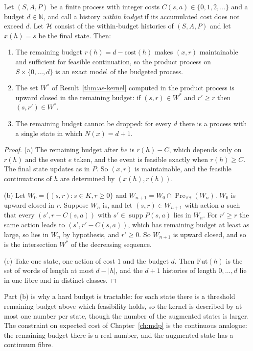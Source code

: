 \begin{newresult}\label{prop:hard-budget}
Let $(S,A,P)$ be a finite process with integer costs $C(s,a)\in\{0,1,2,\dots\}$ and a budget $d\in\mathbb N$, and call a history \emph{within budget} if its accumulated cost does not exceed $d$. Let $\mathcal{H}$ consist of the within-budget histories of $(S,A,P)$ and let $x(h)=s$ be the final state. Then:
\begin{enumerate}[nosep,label=(\alph*)]
  \item The remaining budget $r(h)=d-\text{cost}(h)$ makes $(x,r)$ maintainable and sufficient for feasible continuation, so the product process on $S\times\{0,\dots,d\}$ is an exact model of the budgeted process.
  \item The set $W^{*}$ of Result~\ref{thm:as-kernel} computed in the product process is upward closed in the remaining budget: if $(s,r)\in W^{*}$ and $r'\ge r$ then $(s,r')\in W^{*}$.
  \item The remaining budget cannot be dropped: for every $d$ there is a process with a single state in which $N(x)=d+1$.
\end{enumerate}
\end{newresult}
\begin{proof}
(a) The remaining budget after $he$ is $r(h)-C$, which depends only on $r(h)$ and the event $e$ taken, and the event is feasible exactly when $r(h)\ge C$. The final state updates as in $P$. So $(x,r)$ is maintainable, and the feasible continuations of $h$ are determined by $(x(h),r(h))$.

(b) Let $W_0=\{(s,r):s\in K,r\ge0\}$ and $W_{n+1}=W_0\cap\operatorname{Pre}_{\forall\exists}(W_n)$. $W_0$ is upward closed in $r$. Suppose $W_n$ is, and let $(s,r)\in W_{n+1}$ with action $a$ such that every $(s',r-C(s,a))$ with $s'\in\operatorname{supp}P(s,a)$ lies in $W_n$. For $r'\ge r$ the same action leads to $(s',r'-C(s,a))$, which has remaining budget at least as large, so lies in $W_n$ by hypothesis, and $r'\ge0$. So $W_{n+1}$ is upward closed, and so is the intersection $W^{*}$ of the decreasing sequence.

(c) Take one state, one action of cost $1$ and the budget $d$. Then $\mathrm{Fut}(h)$ is the set of words of length at most $d-|h|$, and the $d+1$ histories of length $0,\dots,d$ lie in one fibre and in distinct classes.
\end{proof}

Part (b) is why a hard budget is tractable: for each state there is a threshold remaining budget above which feasibility holds, so the kernel is described by at most one number per state, though the number of the augmented states is larger. The constraint on expected cost of Chapter~\ref{ch:mdp} is the continuous analogue: the remaining budget there is a real number, and the augmented state has a continuum fibre.

